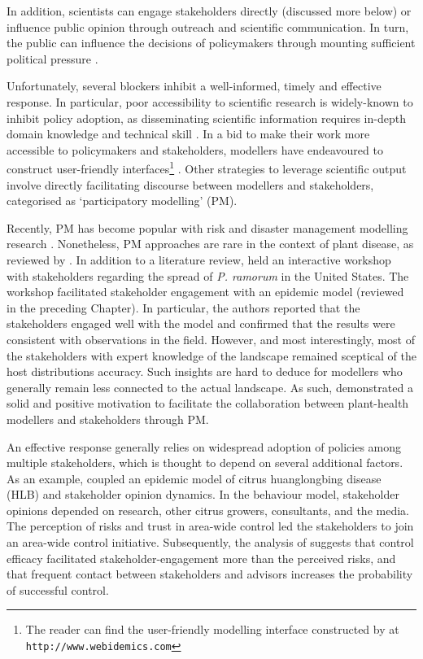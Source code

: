 In addition, scientists can engage stakeholders directly (discussed more below) or influence public opinion through outreach and
scientific communication. In turn, the public can influence the decisions of policymakers through
mounting sufficient political pressure \cite{fuller2016public}.

Unfortunately, several blockers inhibit a well-informed, timely and effective response. 
In particular, poor accessibility to scientific research is widely-known to inhibit policy adoption, 
as disseminating scientific information requires in-depth domain knowledge and technical skill \cite{jones2020modelling}.
In a bid to make their work more accessible to policymakers and stakeholders, modellers have endeavoured to construct user-friendly interfaces\footnote{
The reader can find the user-friendly modelling interface constructed by \cite{WEBIDEMICS} at \nolinkurl{http://www.webidemics.com}} \cite{WEBIDEMICS}.
Other strategies to leverage scientific output involve directly facilitating discourse between modellers and stakeholders, categorised as `participatory modelling' (PM).

Recently, PM has become popular with risk and disaster management modelling research \cite{hamalainen2020leadership, ravera2020participatory, hedelin2017participatory}.
Nonetheless, PM approaches are rare in the context of plant disease, as reviewed by \cite{gaydos2019forecasting}.
In addition to a literature review, \cite{gaydos2019forecasting} held an interactive workshop with stakeholders
regarding the spread of \textit{P. ramorum} in the United States. The workshop facilitated stakeholder engagement
with an epidemic model \cite{tonini2017tangible} (reviewed in the preceding Chapter). In particular, the authors reported
that the stakeholders engaged well with the model and confirmed that the results were consistent with observations in the field. However, and most interestingly, most of the stakeholders with expert knowledge of the landscape remained sceptical of the host distributions accuracy. 
Such insights are hard to deduce for modellers who generally remain less connected to the actual landscape. 
As such, \cite{tonini2017tangible} demonstrated a solid and positive motivation to facilitate the collaboration 
between plant-health modellers and stakeholders through PM.

An effective response generally relies on widespread adoption of policies among multiple 
stakeholders, which is thought to depend on several additional factors. As an example, \cite{milne2020makes} coupled
an epidemic model of citrus huanglongbing disease (HLB) and stakeholder opinion dynamics. In the behaviour model, stakeholder
opinions depended on research, other citrus growers, consultants, and the media. The perception of risks and trust in
area-wide control led the stakeholders to join an area-wide control initiative. Subsequently, the analysis of 
\cite{milne2020makes} suggests that control efficacy facilitated stakeholder-engagement more than the perceived risks,
and that frequent contact between stakeholders and advisors increases the probability of successful control.



